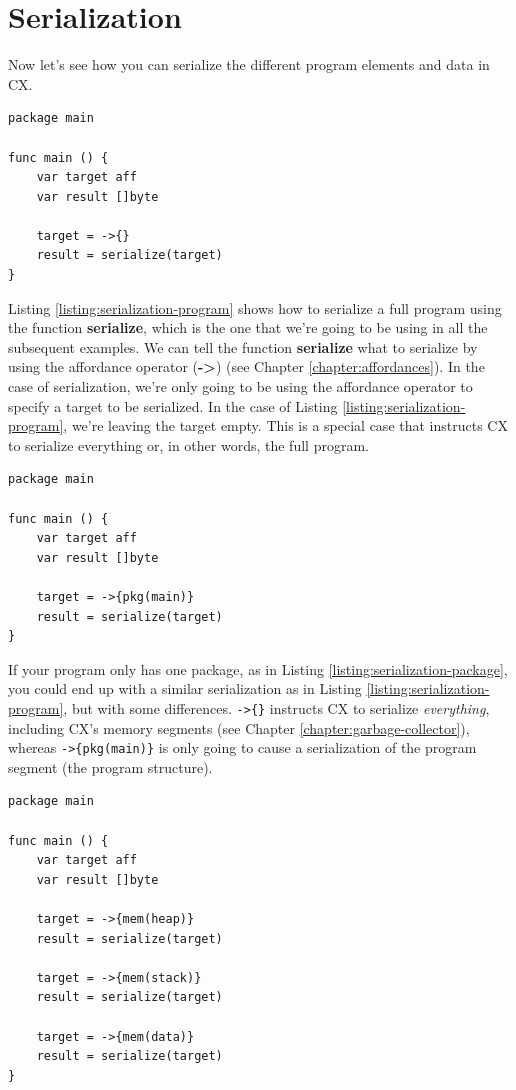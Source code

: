 \documentclass[11pt,fleqn,openany]{book} %
\begin{document}
\section{Serialization}
\label{section:serialization}

Now let's see how you can serialize the different program elements and data in CX.

\begin{lstlisting}[caption={Serialization of a Program},captionpos=b,label={listing:serialization-program}]
package main

func main () {
    var target aff
    var result []byte
    
    target = ->{}
    result = serialize(target)
}
\end{lstlisting}

Listing \ref{listing:serialization-program} shows how to serialize a full program using the function \textbf{serialize}, which is the one that we're going to be using in all the subsequent examples. We can tell the function \textbf{serialize} what to serialize by using the affordance operator (\textbf{->}) (see Chapter \ref{chapter:affordances}). In the case of serialization, we're only going to be using the affordance operator to specify a target to be serialized. In the case of Listing \ref{listing:serialization-program}, we're leaving the target empty. This is a special case that instructs CX to serialize everything or, in other words, the full program.

\begin{lstlisting}[caption={Serialization of a Package},captionpos=b,label={listing:serialization-package}]
package main

func main () {
    var target aff
    var result []byte
    
    target = ->{pkg(main)}
    result = serialize(target)
}
\end{lstlisting}

If your program only has one package, as in Listing \ref{listing:serialization-package}, you could end up with a similar serialization as in Listing \ref{listing:serialization-program}, but with some differences. \lstinline|->{}| instructs CX to serialize \emph{everything}, including CX's memory segments (see Chapter \ref{chapter:garbage-collector}), whereas \lstinline|->{pkg(main)}| is only going to cause a serialization of the program segment (the program structure).

\begin{lstlisting}[caption={Serialization of the Memory Segments},captionpos=b,label={listing:serialization-memory-segments}]
package main

func main () {
    var target aff
    var result []byte
    
    target = ->{mem(heap)}
    result = serialize(target)
    
    target = ->{mem(stack)}
    result = serialize(target)
    
    target = ->{mem(data)}
    result = serialize(target)
}
\end{lstlisting}
\end{document}
